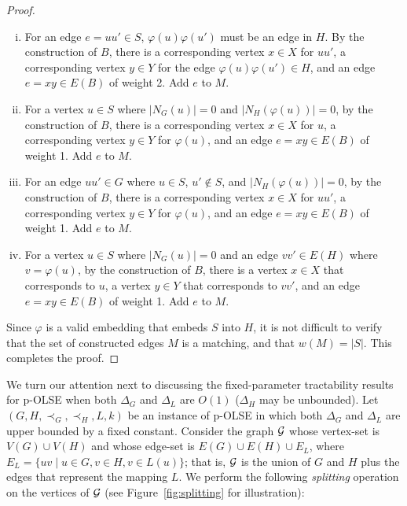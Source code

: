 \documentclass[11pt]{article}
\let\phi=\varphi
\begin{document}
\begin{proof}
\begin{enumerate}[(i)]
  \item For an edge $e= uu' \in S$, $\phi(u)\phi(u')$ must be an edge in $H$. By the construction of $B$, there is a corresponding vertex $x \in X$ for $uu'$, a corresponding vertex $y \in Y$ for the edge $\phi(u)\phi(u') \in H$, and an edge $e=xy \in E(B)$ of weight 2.  Add $e$ to $M$.

  \item For a vertex $u \in S$ where $|N_G(u)| = 0$ and $|N_H(\phi(u))| = 0$, by the construction of $B$, there is a corresponding vertex $x \in X$ for $u$, a corresponding vertex $y \in Y$ for $\phi(u)$, and an edge $e=xy \in E(B)$ of weight 1.  Add $e$ to $M$.

  \item For an edge $uu' \in G$ where $u \in S$, $u' \notin S$, and $|N_H(\phi(u))| = 0$, by the construction of $B$, there is a corresponding vertex $x \in X$ for $uu'$, a corresponding vertex $y \in Y$ for $\phi(u)$, and an edge $e=xy \in E(B)$ of weight 1.  Add $e$ to $M$.

  \item For a vertex $u \in S$ where $|N_G(u)| = 0$ and an edge $vv' \in E(H)$ where $v = \phi(u)$, by the construction of $B$, there is a vertex $x \in X$ that corresponds to $u$, a vertex $y \in Y$ that corresponds to $vv'$, and an edge $e=xy \in E(B)$ of weight 1.  Add $e$ to $M$.
\end{enumerate}

Since $\phi$ is a valid embedding that embeds $S$ into $H$, it is not difficult to verify that the set of constructed edges $M$ is a matching, and that $w(M) = |S|$. This completes the proof. \end{proof}


We turn our attention next to discussing the fixed-parameter tractability results for p-OLSE when both $\Delta_G$ and $\Delta_L$ are $O(1)$ ($\Delta_H$ may be unbounded). Let $(G, H, \prec_G, \prec_H, L, k)$ be an instance of p-OLSE in which both $\Delta_G$ and $\Delta_L$ are upper bounded by a fixed constant. Consider the graph ${\cal G}$ whose vertex-set is $V(G) \cup V(H)$ and whose edge-set is $E(G) \cup E(H) \cup E_L$, where $E_L=\{uv \mid u \in G, v \in H, v \in L(u)\}$; that is, ${\cal G}$ is the union of $G$ and $H$ plus the edges that represent the mapping $L$. We perform the following {\em splitting} operation on the vertices of ${\cal G}$ (see Figure~\ref{fig:splitting} for illustration):
\end{document}
